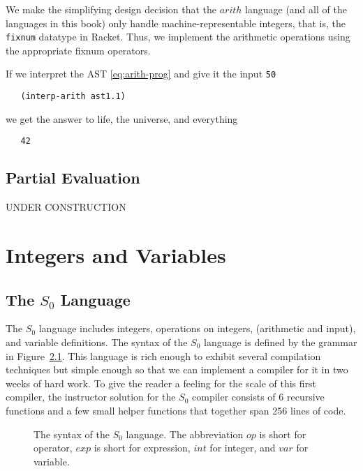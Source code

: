 \documentclass[12pt]{book}
\makeatletter
\newenvironment{chapquote}[2][2em]
  {\setlength{\@tempdima}{#1}%
   \def\chapquote@author{#2}%
   \parshape 1 \@tempdima \dimexpr\textwidth-2\@tempdima\relax%
   \itshape}
  {\par\normalfont\hfill--\ \chapquote@author\hspace*{\@tempdima}\par\bigskip}
\newcommand{\itm}[1]{\ensuremath{\mathit{#1}}}
\newcommand{\Exp}{\itm{exp}}
\newcommand{\Int}{\itm{int}}
\newcommand{\Var}{\itm{var}}
\newcommand{\Op}{\itm{op}}
\newcommand{\key}[1]{\texttt{#1}}
\newcommand{\LET}[3]{(\key{let}\,([#1\;#2])\,#3)}
\makeatother
\begin{document}
We make the simplifying design decision that the $\itm{arith}$
language (and all of the languages in this book) only handle
machine-representable integers, that is, the \texttt{fixnum} datatype
in Racket. Thus, we implement the arithmetic operations using the
appropriate fixnum operators.

If we interpret the AST \eqref{eq:arith-prog} and give it the input
\texttt{50}
\begin{lstlisting}
   (interp-arith ast1.1)
\end{lstlisting}
we get the answer to life, the universe, and everything
\begin{lstlisting}
   42
\end{lstlisting}


\section{Partial Evaluation}
\label{sec:partial-evaluation}


UNDER CONSTRUCTION


\chapter{Integers and Variables}
\label{ch:int-exp}


\section{The $S_0$ Language}

The $S_0$ language includes integers, operations on integers,
(arithmetic and input), and variable definitions.  The syntax of the
$S_0$ language is defined by the grammar in
Figure~\ref{fig:s0-syntax}. This language is rich enough to exhibit
several compilation techniques but simple enough so that we can
implement a compiler for it in two weeks of hard work.  To give the
reader a feeling for the scale of this first compiler, the instructor
solution for the $S_0$ compiler consists of 6 recursive functions and
a few small helper functions that together span 256 lines of code.

\begin{figure}[btp]
\centering
\fbox{
\begin{minipage}{0.85\textwidth}
\[
\begin{array}{lcl}
  \Op  &::=& \key{+} \mid \key{-} \mid \key{*} \mid \key{read} \\
  \Exp &::=& \Int \mid (\Op \; \Exp^{*}) \mid \Var \mid \LET{\Var}{\Exp}{\Exp}
\end{array}
\]
\end{minipage}
}
\caption{The syntax of the $S_0$ language. The abbreviation \Op{} is
  short for operator, \Exp{} is short for expression, \Int{} for integer,
  and \Var{} for variable.}
\label{fig:s0-syntax}
\end{figure}
\end{document}
